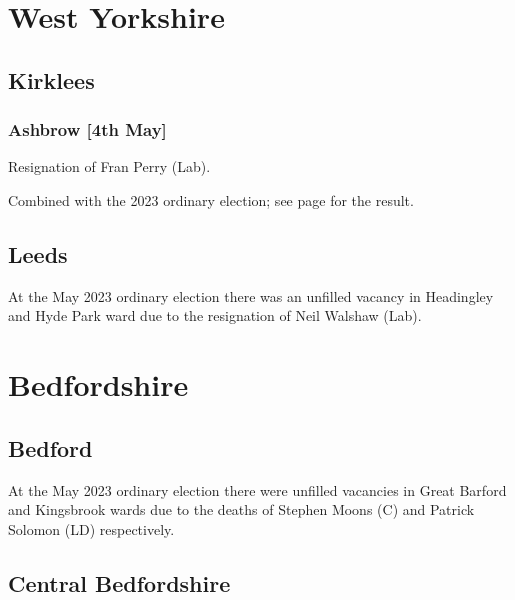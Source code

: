 \documentclass[a4paper,openany]{book}
\begin{document}
\begin{resultsiii}
\section{West Yorkshire}

\subsection*{Kirklees}

\subsubsection*{Ashbrow \hspace*{\fill}\nolinebreak[1]%
	\enspace\hspace*{\fill}
	[4th May]}


Resignation of Fran Perry (Lab).

Combined with the 2023 ordinary election; see page \pageref{KirkleesAshbrow} for the result.

\subsection*{Leeds}

At the May 2023 ordinary election there was an unfilled vacancy in Headingley and Hyde Park ward due to the resignation of Neil Walshaw (Lab).%

\section{Bedfordshire}

\subsection*{Bedford}

At the May 2023 ordinary election there were unfilled vacancies in Great Barford and Kingsbrook wards due to the deaths of Stephen Moons (C) and Patrick Solomon (LD) respectively.%
%

\subsection*{Central Bedfordshire}


\end{resultsiii}
\end{document}
